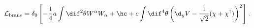 \begin{equation}
\mathcal{L}_{\mathrm{brane}} = \delta_0 \left[  -\frac{1}{4} a \int
\dif^2 
\theta W^\alpha W_\alpha + \hc + c \int \dif^4 \theta \left(\d_y V -
\frac{1}{\sqrt{2}} (\chi+\chi^\dagger) \right)^2 \right] \, .
\end{equation}


